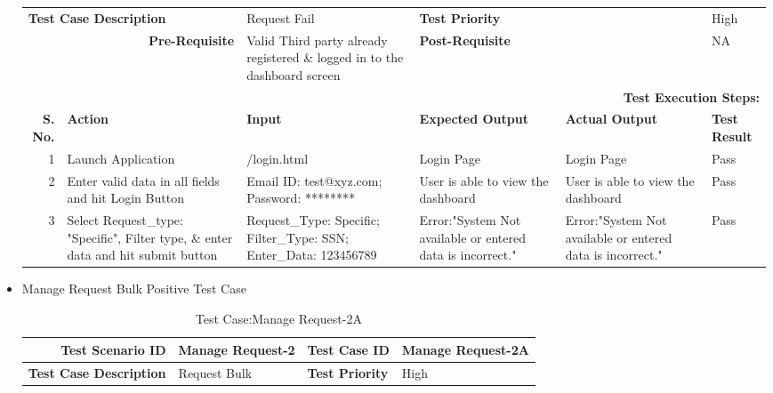 \documentclass[a4paper, hidelinks, 12pt]{report}
\begin{document}
\begin{itemize}
\begin{table}[H]
\begin{tabular}{|r|p{4.355em}|p{7.715em}|p{6.43em}|p{5.855em}|p{5.07em}|}
    \midrule
    \multicolumn{2}{|l|}{\multirow{2}[2]{*}{\textbf{Test Case Description}}} & \multirow{2}[2]{*}{Request Fail} & \multicolumn{2}{l|}{\multirow{2}[2]{*}{\textbf{Test Priority}}} & \multirow{2}[2]{*}{High} \\
    \multicolumn{2}{|l|}{} & \multicolumn{1}{l|}{} & \multicolumn{2}{l|}{} & \multicolumn{1}{l|}{} \\
    \midrule
    \multicolumn{2}{|p{13.425em}|}{\textbf{Pre-Requisite}} & Valid Third party already registered \& logged in to the dashboard screen & \multicolumn{2}{p{12.285em}|}{\textbf{Post-Requisite}} & NA \\
    \midrule
    \multicolumn{6}{p{38.495em}|}{\textbf{Test Execution Steps:}} \\
    \midrule
    \multicolumn{1}{|p{5.07em}|}{\textbf{S. No.}} & \textbf{Action } & \textbf{Input} & \textbf{Expected Output} & \textbf{Actual Output} & \textbf{Test Result} \\
    \midrule
    1     & Launch Application & /login.html & Login Page & Login Page & Pass \\
    \midrule
    2     & Enter valid data in all fields and hit Login Button & Email ID: test@xyz.com; Password: ******** & User is able to view the dashboard & User is able to view the dashboard & Pass \\
    \midrule
    3     & Select Request\_type: "Specific", Filter type, \& enter data and hit submit button & Request\_Type: Specific; Filter\_Type: SSN; Enter\_Data: 123456789 & Error:"System Not available or entered data is incorrect." & Error:"System Not available or entered data is incorrect." & Pass \\
    \bottomrule
    \end{tabular}%
  \label{tab:Test Case:Manage_Request-1B}%
\end{table}%
\item{Manage Request Bulk Positive Test Case}
\begin{table}[H]
  \centering
  \caption{Test Case:Manage Request-2A}
    \begin{tabular}{|r|p{4.355em}|p{7.715em}|p{6.43em}|p{5.855em}|p{5.07em}|}
    \toprule
    \multicolumn{2}{|p{13.425em}|}{\textbf{Test Scenario ID}} & Manage Request-2 & \multicolumn{2}{p{12.285em}|}{\textbf{Test Case ID}} & Manage Request-2A \\
    \midrule
    \multicolumn{2}{|l|}{\multirow{2}[2]{*}{\textbf{Test Case Description}}} & \multirow{2}[2]{*}{Request Bulk} & \multicolumn{2}{l|}{\multirow{2}[2]{*}{\textbf{Test Priority}}} & \multirow{2}[2]{*}{High} \\

\end{tabular}
\end{table}
\end{itemize}
\end{document}
